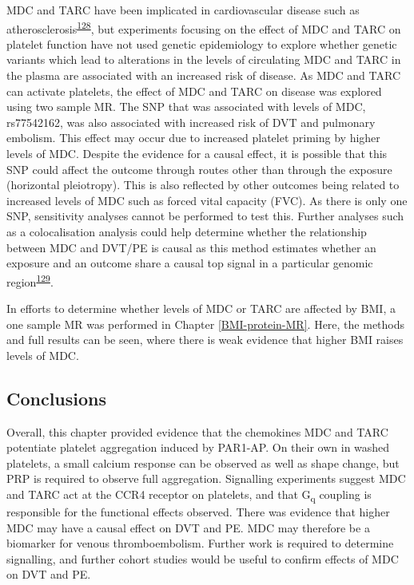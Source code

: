\documentclass[11pt,twoside]{bristolthesis}
\begin{document}
MDC and TARC have been implicated in cardiovascular disease such as atherosclerosis\textsuperscript{\protect\hyperlink{ref-Weber2004}{128}}, but experiments focusing on the effect of MDC and TARC on platelet function have not used genetic epidemiology to explore whether genetic variants which lead to alterations in the levels of circulating MDC and TARC in the plasma are associated with an increased risk of disease. As MDC and TARC can activate platelets, the effect of MDC and TARC on disease was explored using two sample MR. The SNP that was associated with levels of MDC, rs77542162, was also associated with increased risk of DVT and pulmonary embolism. This effect may occur due to increased platelet priming by higher levels of MDC. Despite the evidence for a causal effect, it is possible that this SNP could affect the outcome through routes other than through the exposure (horizontal pleiotropy). This is also reflected by other outcomes being related to increased levels of MDC such as forced vital capacity (FVC). As there is only one SNP, sensitivity analyses cannot be performed to test this. Further analyses such as a colocalisation analysis could help determine whether the relationship between MDC and DVT/PE is causal as this method estimates whether an exposure and an outcome share a causal top signal in a particular genomic region\textsuperscript{\protect\hyperlink{ref-Giambartolomei2014}{129}}.

In efforts to determine whether levels of MDC or TARC are affected by BMI, a one sample MR was performed in Chapter \ref{BMI-protein-MR}. Here, the methods and full results can be seen, where there is weak evidence that higher BMI raises levels of MDC.

\hypertarget{conclusions}{%
\subsection{Conclusions}\label{conclusions}}

Overall, this chapter provided evidence that the chemokines MDC and TARC potentiate platelet aggregation induced by PAR1-AP. On their own in washed platelets, a small calcium response can be observed as well as shape change, but PRP is required to observe full aggregation. Signalling experiments suggest MDC and TARC act at the CCR4 receptor on platelets, and that G\textsubscript{q} coupling is responsible for the functional effects observed. There was evidence that higher MDC may have a causal effect on DVT and PE. MDC may therefore be a biomarker for venous thromboembolism. Further work is required to determine signalling, and further cohort studies would be useful to confirm effects of MDC on DVT and PE.
\end{document}
